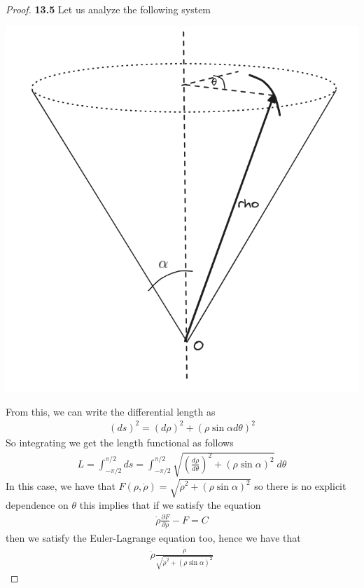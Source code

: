 \documentclass[11pt]{article}
\theoremstyle{definition}
\begin{document}
\begin{proof}{\textbf{13.5}}
    Let us analyze the following system
    \begin{center}
        \includegraphics[scale=0.4]{ch13-5.png}
    \end{center}
    From this, we can write the differential length as
    \begin{align*}
        (ds)^2 = (d\rho)^2 + (\rho \sin\alpha d\theta)^2
    \end{align*}
    So integrating we get the length functional as follows
    \begin{align*}
        L = \int_{-\pi/2}^{\pi/2} ds =
        \int_{-\pi/2}^{\pi/2} \sqrt{\left(\frac{d\rho}{d\theta}\right)^2 + (\rho \sin\alpha)^2}~d\theta
    \end{align*}
    In this case, we have that
    $F(\rho,\dot{\rho}) = \sqrt{\dot\rho^2 + (\rho\sin\alpha)^2}$
    so there is no explicit dependence on $\theta$ this implies that if we
    satisfy the equation
    \begin{align*}
        \dot{\rho}\frac{\partial F}{\partial\dot{\rho}} - F = C
    \end{align*}
    then we satisfy the Euler-Lagrange equation too, hence we have that
    \begin{align*}
        \dot{\rho}\frac{\dot{\rho}}{\sqrt{\dot\rho^2 + (\rho\sin\alpha)^2}}

\end{align*}
\end{proof}
\end{document}
